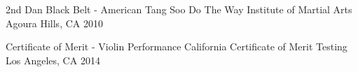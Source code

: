 



\begin{cvhonors}

  \cvhonor
    {2nd Dan Black Belt - American Tang Soo Do} %
    {The Way Institute of Martial Arts} %
    {Agoura Hills, CA} %
    {2010} %

  \cvhonor
    {Certificate of Merit - Violin Performance} %
    {California Certificate of Merit Testing} %
    {Los Angeles, CA} %
    {2014} %

\end{cvhonors}
